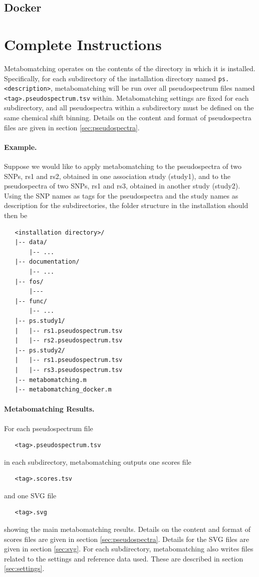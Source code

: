 \documentclass[a4paper,11pt]{article}
\begin{document}
\subsection{Docker}
\clearpage

\section{Complete Instructions}
Metabomatching operates on the contents of the directory in which it is installed. Specifically, for each subdirectory of the installation directory named \texttt{ps.<description>}, metabomatching will be run over all pseudospectrum files named \texttt{<tag>.pseudospectrum.tsv} within. Metabomatching settings are fixed for each subdirectory, and all pseudospectra within a subdirectory must be defined on the same chemical shift binning. Details on the content and format of pseudospectra files are given in section \ref{sec:pseudospectra}.

\paragraph{Example.} Suppose we would like to apply metabomatching to the pseudospectra of two SNPs, rs1 and rs2, obtained in one association study (study1), and to the pseudospectra of two SNPs, rs1 and rs3, obtained in another study (study2). Using the SNP names as tags for the pseudospectra and the study names as description for the subdirectories, the folder structure in the installation should then be
\begin{verbatim}
   <installation directory>/
   |-- data/
       |-- ...
   |-- documentation/
       |-- ...
   |-- fos/
       |---
   |-- func/
       |-- ...
   |-- ps.study1/
   |   |-- rs1.pseudospectrum.tsv
   |   |-- rs2.pseudospectrum.tsv
   |-- ps.study2/
   |   |-- rs1.pseudospectrum.tsv
   |   |-- rs3.pseudospectrum.tsv
   |-- metabomatching.m
   |-- metabomatching_docker.m
\end{verbatim}
\paragraph{Metabomatching Results.} For each pseudospectrum file
\begin{verbatim}
   <tag>.pseudospectrum.tsv
\end{verbatim}
in each subdirectory, metabomatching outputs one scores file 
\begin{verbatim}
   <tag>.scores.tsv
\end{verbatim}
and one SVG file
\begin{verbatim}
   <tag>.svg
\end{verbatim}
showing the main metabomatching results. Details on the content and format of scores files are given in section \ref{sec:pseudospectra}. Details for the SVG files are given in section \ref{sec:svg}. For each subdirectory, metabomatching also writes files related to the settings and reference data used. These are described in section \ref{sec:settings}.
\end{document}
